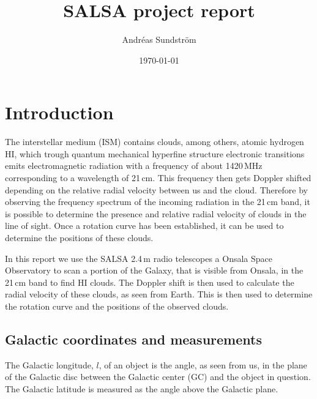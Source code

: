 \documentclass[11pt,a4paper, twocolumn,
swedish, english %
]{article}
\begin{document}


\title{SALSA project report}
\author{Andréas Sundström}
\date{\today}


\twocolumn[
\begin{@twocolumnfalse}
\maketitle
\begin{abstract}

\end{abstract}
\end{@twocolumnfalse}
]



\section{Introduction}
The interstellar medium (ISM) contains clouds, among others, atomic
hydrogen HI, which trough quantum mechanical hyperfine structure
electronic transitions emits electromagnetic radiation with a
frequency of about 1420\,MHz corresponding to a wavelength of
21\,cm. This frequency then gets Doppler shifted depending on the
relative radial velocity between us and the cloud. Therefore by
observing the frequency spectrum of the incoming radiation in the
21\,cm band, it is possible to determine the presence and relative
radial velocity of clouds in the line of sight.
Once a rotation curve has been established, it can be used to
determine the positions of these clouds.

In this report we use the SALSA 2.4\,m radio telescopes a Onsala Space
Observatory to scan a portion of the Galaxy, that is visible from Onsala,
in the 21\,cm band to find HI clouds. The Doppler shift is then used
to calculate the radial velocity of these clouds, as seen from
Earth. This is then used to determine the rotation curve and the
positions of the observed clouds.

\subsection{Galactic coordinates and measurements}
The Galactic longitude, $l$, of an object is the angle, as seen from
us, in the plane of the Galactic disc between the Galactic center (GC)
and the object in question. %
The Galactic latitude is measured as the angle above the Galactic
plane. 
\end{document}

